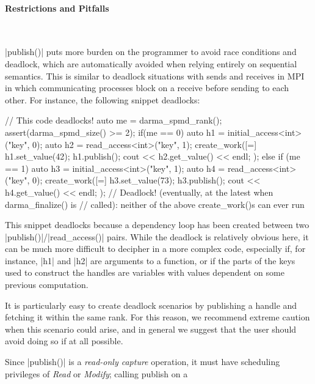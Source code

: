 \paragraph{Restrictions and Pitfalls}\mbox{}\\
\begin{compactitem}
  \item |publish()| puts more burden on the programmer to avoid race conditions and deadlock, 
  which are automatically avoided when relying entirely on sequential semantics.
  This is similar to deadlock situations with sends and receives in MPI in which communicating processes block on a receive before sending to each other.  
  For instance, the following snippet deadlocks:
  \begin{CppCode}
// This code deadlocks!
auto me = darma_spmd_rank();
assert(darma_spmd_size() >= 2);
if(me == 0) {
  auto h1 = initial_access<int>("key", 0);
  auto h2 = read_access<int>("key", 1);
  create_work([=]{ 
    h1.set_value(42);
    h1.publish();
    cout << h2.get_value() << endl;
  }); 
}
else if (me == 1) {
  auto h3 = initial_access<int>("key", 1);
  auto h4 = read_access<int>("key", 0);
  create_work([=]{ 
    h3.set_value(73);
    h3.publish();
    cout << h4.get_value() << endl; 
  }); 
}
// Deadlock! (eventually, at the latest when darma_finalize() is
// called): neither of the above create_work()s can ever run
  \end{CppCode}
  This snippet deadlocks because a dependency loop has been created between two
  |publish()|/|read_access()| pairs. While the deadlock is
  relatively obvious here, it can be much more difficult to decipher in a more
  complex code, especially if, for instance, |h1| and |h2| are
  arguments to a function, or if the parts of the keys used to construct the
  handles are variables with values dependent on some previous computation.
  \item It is particularly easy to create deadlock scenarios by publishing a
  handle and fetching it within the same rank.  For this reason, we recommend
  extreme caution when this scenario could arise, and in general we suggest that
  the user should avoid doing so if at all possible.
  \item Since |publish()| is a {\it read-only capture} operation, it must
  have scheduling privileges of {\it Read} or {\it Modify}; calling publish on a

\end{compactitem}
